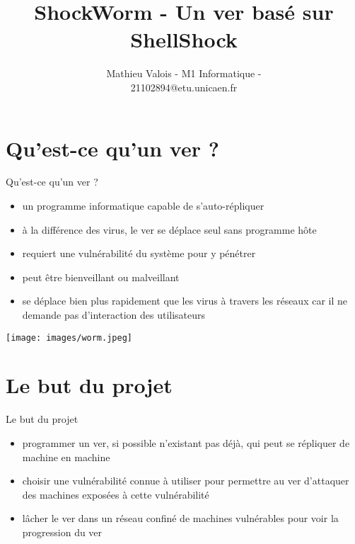 \documentclass[11pt]{beamer}
\author{Mathieu Valois - M1 Informatique - \\ 21102894@etu.unicaen.fr}
\title{ShockWorm - Un ver basé sur ShellShock}
\institute{Université de Caen Basse-Normandie}
\begin{document}
\begin{frame}
\titlepage
\end{frame}

\begin{frame}
\tableofcontents
\end{frame}

\section{Qu'est-ce qu'un ver ?}
\begin{frame}{Qu'est-ce qu'un ver ?}
\begin{itemize}
\item un programme informatique capable de s'auto-répliquer
\item à la différence des virus, le ver se déplace seul sans programme hôte
\item requiert une vulnérabilité du système pour y pénétrer
\item peut être bienveillant ou malveillant
\item se déplace bien plus rapidement que les virus à travers les réseaux car il ne demande pas d'interaction des utilisateurs
\end{itemize}
\begin{center}
\texttt{[image: images/worm.jpeg]}
\end{center}
\end{frame}

\section{Le but du projet}
\begin{frame}{Le but du projet}
\begin{itemize}
\item programmer un ver, si possible n'existant pas déjà, qui peut se répliquer de machine en machine
\item choisir une vulnérabilité connue à utiliser pour permettre au ver d'attaquer des machines exposées à cette vulnérabilité
\item lâcher le ver dans un réseau confiné de machines vulnérables pour voir la progression du ver
\end{itemize}
\end{frame}
\end{document}

